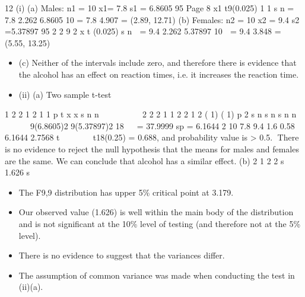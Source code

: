 \documentclass[a4paper,12pt]{article}
\begin{document}
\begin{enumerate}
\newpage

12 (i) (a) Males: n1 = 10 x1= 7.8 s1 = 6.8605
95%
Page 8
x1 
 t9(0.025) 1
1
s
n
= 7.8 
 2.262 6.8605
10
= 7.8 
 4.907
= (2.89, 12.71)
(b) Females: n2 = 10 x2 = 9.4 s2 =5.37897
95%
2
2 9
2
x t (0.025) s
n

= 9.4 2.262 5.37897
10
 = 9.4 
 3.848
= (5.55, 13.25)

\begin{itemize}
    \item (c) Neither of the intervals include zero, and therefore there is evidence
that the alcohol has an effect on reaction times, i.e. it increases the
reaction time.
\item (ii) (a) Two sample t-test
\end{itemize}

1 2
2
1 2
1 1
p
t x x
s
n n


 
  
 	
2 2
2 1 1 2 2
1 2
( 1) ( 1)
p 2
s n s n s
n n
  

 
9(6.8605)2 9(5.37897)2
18

 = 37.9999
sp = 6.1644
2
10
7.8 9.4 1.6 0.58
6.1644 2.7568
t  
   
t18(0.25) = 0.688, and probability value is > 0.5.
There is no evidence to reject the null hypothesis that the means for
males and females are the same.
We can conclude that alcohol has a similar effect.
(b)
2
1
2
2
s 1.626
s


\begin{itemize}
    \item The F9,9 distribution has upper 5\% critical point at 3.179.
    \item Our
observed value (1.626) is well within the main body of the distribution
and is not significant at the 10\% level of testing (and therefore not at
the 5\% level). 
\item There is no evidence to suggest that the variances
differ. 
\item The assumption of common variance was made when
conducting the test in (ii)(a).
\end{itemize}


\end{enumerate}
\end{document}
